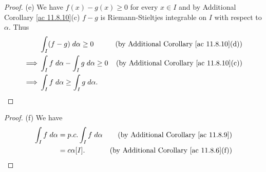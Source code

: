 \begin{proof}{(e)}
    We have \(f(x) - g(x) \geq 0\) for every \(x \in I\) and by Additional Corollary \ref{ac 11.8.10}(c) \(f - g\) is Riemann-Stieltjes integrable on \(I\) with respect to \(\alpha\).
    Thus
    \begin{align*}
                 & \int_I (f - g) \; d \alpha \geq 0                  & \text{(by Additional Corollary \ref{ac 11.8.10}(d))} \\
        \implies & \int_I f \; d \alpha - \int_I g \; d \alpha \geq 0 & \text{(by Additional Corollary \ref{ac 11.8.10}(c))} \\
        \implies & \int_I f \; d \alpha \geq \int_I g \; d \alpha.
    \end{align*}
\end{proof}

\begin{proof}{(f)}
    We have
    \begin{align*}
        \int_I f \; d \alpha & = p.c. \int_I f \; d \alpha & \text{(by Additional Corollary \ref{ac 11.8.9})}    \\
                             & = c \alpha[I].              & \text{(by Additional Corollary \ref{ac 11.8.6}(f))}
    \end{align*}
\end{proof}

